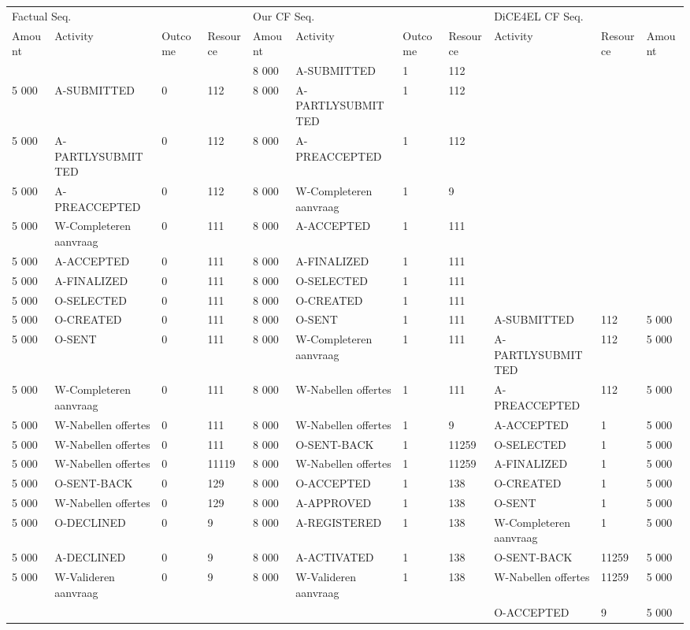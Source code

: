 \begin{tabular}{lllllllllll}
\toprule
\multicolumn{4}{l}{Factual Seq.} & \multicolumn{4}{l}{Our CF Seq.} & \multicolumn{3}{l}{DiCE4EL CF Seq.} \\
Amount & Activity & Outcome & Resource & Amount & Activity & Outcome & Resource & Activity & Resource & Amount \\
\midrule
 &  &  &  & 8 000 & A-SUBMITTED & 1 & 112 &  &  &  \\
5 000 & A-SUBMITTED & 0 & 112 & 8 000 & A-PARTLYSUBMITTED & 1 & 112 &  &  &  \\
5 000 & A-PARTLYSUBMITTED & 0 & 112 & 8 000 & A-PREACCEPTED & 1 & 112 &  &  &  \\
5 000 & A-PREACCEPTED & 0 & 112 & 8 000 & W-Completeren aanvraag & 1 & 9 &  &  &  \\
5 000 & W-Completeren aanvraag & 0 & 111 & 8 000 & A-ACCEPTED & 1 & 111 &  &  &  \\
5 000 & A-ACCEPTED & 0 & 111 & 8 000 & A-FINALIZED & 1 & 111 &  &  &  \\
5 000 & A-FINALIZED & 0 & 111 & 8 000 & O-SELECTED & 1 & 111 &  &  &  \\
5 000 & O-SELECTED & 0 & 111 & 8 000 & O-CREATED & 1 & 111 &  &  &  \\
5 000 & O-CREATED & 0 & 111 & 8 000 & O-SENT & 1 & 111 & A-SUBMITTED & 112 & 5 000 \\
5 000 & O-SENT & 0 & 111 & 8 000 & W-Completeren aanvraag & 1 & 111 & A-PARTLYSUBMITTED & 112 & 5 000 \\
5 000 & W-Completeren aanvraag & 0 & 111 & 8 000 & W-Nabellen offertes & 1 & 111 & A-PREACCEPTED & 112 & 5 000 \\
5 000 & W-Nabellen offertes & 0 & 111 & 8 000 & W-Nabellen offertes & 1 & 9 & A-ACCEPTED & 1 & 5 000 \\
5 000 & W-Nabellen offertes & 0 & 111 & 8 000 & O-SENT-BACK & 1 & 11259 & O-SELECTED & 1 & 5 000 \\
5 000 & W-Nabellen offertes & 0 & 11119 & 8 000 & W-Nabellen offertes & 1 & 11259 & A-FINALIZED & 1 & 5 000 \\
5 000 & O-SENT-BACK & 0 & 129 & 8 000 & O-ACCEPTED & 1 & 138 & O-CREATED & 1 & 5 000 \\
5 000 & W-Nabellen offertes & 0 & 129 & 8 000 & A-APPROVED & 1 & 138 & O-SENT & 1 & 5 000 \\
5 000 & O-DECLINED & 0 & 9 & 8 000 & A-REGISTERED & 1 & 138 & W-Completeren aanvraag & 1 & 5 000 \\
5 000 & A-DECLINED & 0 & 9 & 8 000 & A-ACTIVATED & 1 & 138 & O-SENT-BACK & 11259 & 5 000 \\
5 000 & W-Valideren aanvraag & 0 & 9 & 8 000 & W-Valideren aanvraag & 1 & 138 & W-Nabellen offertes & 11259 & 5 000 \\
 &  &  &  &  &  &  &  & O-ACCEPTED & 9 & 5 000 \\
\bottomrule
\end{tabular}
